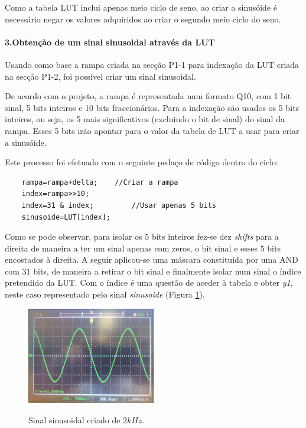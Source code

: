 \documentclass[11pt]{article}
\numberwithin{equation}{section}
\begin{document}
Como a tabela LUT inclui apenas meio ciclo de seno, ao criar a sinusóide é necessário negar os valores adquiridos ao criar o segundo meio ciclo do seno.

\paragraph{3.Obtenção de um sinal sinusoidal através da LUT} \hspace{0pt}

Usando como base a rampa criada na secção P1-1 para indexação da LUT criada na secção P1-2, foi possível criar um sinal  sinusoidal.

De acordo com o projeto, a rampa é representada num formato Q10, com 1 bit sinal, 5 bits inteiros e 10 bits fraccionários. 
Para a indexação são usados os 5 bits inteiros, ou seja, os 5 mais significativos (excluindo o bit de sinal) do sinal da rampa. Esses 5 bits irão apontar para o valor da tabela de LUT a usar para criar a sinusóide. 

Este processo foi efetuado com o seguinte pedaço de código dentro do ciclo:

\begin{lstlisting}
	rampa=rampa+delta;    //Criar a rampa
	index=rampa>>10;
	index=31 & index;         //Usar apenas 5 bits
	sinusoide=LUT[index];
\end{lstlisting}

Como se pode observar, para isolar os 5 bits inteiros fez-se dez \textit{shifts} para a direita de maneira a ter um sinal apenas com zeros, o bit sinal e esses 5 bits encostados à direita. A seguir aplicou-se uma máscara constituída por uma AND com 31 bits, de maneira a retirar o bit sinal e finalmente isolar num sinal o índice pretendido da LUT. Com o índice é uma questão de aceder à tabela e obter \textit{y1}, neste caso representado pelo sinal \textit{sinusoide} (Figura \ref{fig:sen2k}).

\begin{figure}[H]
	\centering
	\includegraphics[width=0.5\textwidth]{./P1_1seno}~\\
	\caption{Sinal sinusoidal criado de $ 2 kHz $.}
	\label{fig:sen2k}
\end{figure}
\end{document}
